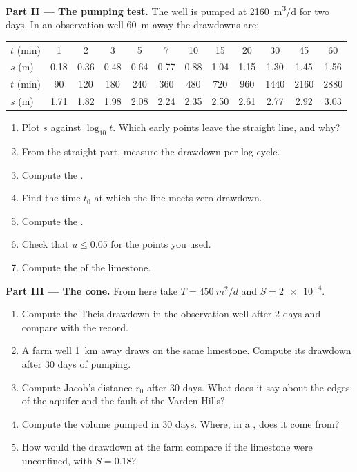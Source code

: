 \begin{problem}
\medskip\noindent\textbf{Part II --- The pumping test.} The well is pumped
at \qty{2160}{m^3/d} for two days. In an observation well \qty{60}{m}
away the drawdowns are:
\begin{center}
\begin{tabular}{l*{11}{c}}
\hline
$t$ (\unit{min}) & 1 & 2 & 3 & 5 & 7 & 10 & 15 & 20 & 30 & 45 & 60\\
$s$ (\unit{m}) & 0.18 & 0.36 & 0.48 & 0.64 & 0.77 & 0.88 & 1.04 & 1.15 & 1.30 & 1.45 & 1.56\\
\hline
$t$ (\unit{min}) & 90 & 120 & 180 & 240 & 360 & 480 & 720 & 960 & 1440 & 2160 & 2880\\
$s$ (\unit{m}) & 1.71 & 1.82 & 1.98 & 2.08 & 2.24 & 2.35 & 2.50 & 2.61 & 2.77 & 2.92 & 3.03\\
\hline
\end{tabular}
\end{center}
\begin{enumerate}[resume]
\item Plot $s$ against $\log_{10}t$. Which early points leave the straight
  line, and why?
\item From the straight part, measure the drawdown per log cycle.
\item Compute the .
\item Find the time $t_0$ at which the line meets zero drawdown.
\item Compute the .
\item Check that $u \le 0.05$ for the points you used.
\item Compute the  of the limestone.
\end{enumerate}

\medskip\noindent\textbf{Part III --- The cone.} From here take $T =
\qty{450}{m^2/d}$ and $S = \num{2e-4}$.
\begin{enumerate}[resume]
\item Compute the Theis drawdown in the observation well after 2 days and
  compare with the record.
\item A farm well \qty{1}{km} away draws on the same limestone. Compute its
  drawdown after 30 days of pumping.
\item Compute Jacob's distance $r_0$ after 30 days. What does it say about
  the edges of the aquifer and the fault of the Varden Hills?
\item Compute the volume pumped in 30 days. Where, in a ,
  does it come from?
\item How would the drawdown at the farm compare if the limestone were
  unconfined, with $S = 0.18$?
\end{enumerate}


\end{problem}

